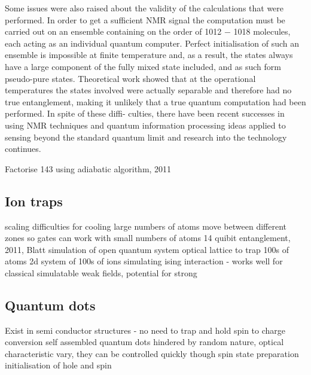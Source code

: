 Some issues were also raised about the validity of the calculations that were performed. In order to get a sufficient NMR signal the computation must be carried out on an ensemble containing on the order of 1012 − 1018 molecules, each acting as an individual quantum computer. Perfect initialisation of such an ensemble is impossible at finite temperature and, as a result, the states always have a large component of the fully mixed state included, and as such form pseudo-pure states. Theoretical work \cite{nmr_pseudo_pure} showed that at the operational temperatures the states involved were actually separable and therefore had no true entanglement, making it unlikely that a true quantum computation had been performed. In spite of these diffi- culties, there have been recent successes in using NMR techniques and quantum information processing ideas applied to sensing beyond the standard quantum limit \cite{nmr_sensing_09} and research into the technology continues.

\cite{nmr_proposal_chuang_97}
\cite{nmr_143_factorization} Factorise 143 using adiabatic algorithm, 2011

\subsection{Ion traps}
\cite{cirac_zoller_ion_trap_proposal_95}
\cite{first_ion_trap_wineland_98}
scaling difficulties for cooling large numbers of atoms
move between different zones so gates can work with small numbers of atoms
\cite{ion_trap_14_qubits} 14 quibit entanglement, 2011, Blatt
\cite{ion_trap_simulator} simulation of open quantum system
\cite{ion_trap_digital_simulator}
optical lattice to trap 100s of atoms
\cite{ion_trap_magnetism_simulator} 2d system of 100s of ions simulating ising interaction - works well for classical simulatable weak fields, potential for strong



\subsection{Quantum dots}
Exist in semi conductor structures - no need to trap and hold
spin to charge conversion
\cite{quantum_dot_review_07}
self assembled quantum dots hindered by random nature, optical characteristic vary, they can be controlled quickly though
\cite{atature_quantum_dot_06} spin state preparation
\cite{gerardot_dot_08} initialisation of hole and spin
\cite{quantum_dot_control_08}
\cite{quantum_dot_measurement_06}


